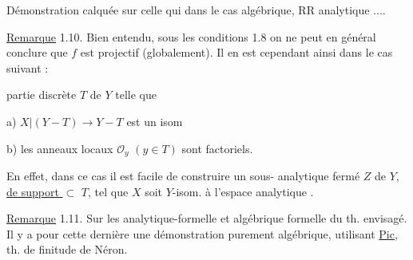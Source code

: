 Démonstration calquée sur celle qui  dans le cas algébrique,  RR analytique ....

\uline{Remarque} 1.10. Bien entendu, sous les conditions 1.8  on ne peut en général conclure que $f$ est projectif (globalement). Il en est cependant ainsi dans le cas suivant :

partie discrète $T$ de $Y$ telle que

a) $X|(Y-T)\longrightarrow Y-T$ est  un isom

b) les anneaux locaux $\mathcal O_y$ $(y\in T)$ sont factoriels.

En effet, dans ce cas il est facile de construire un sous- analytique fermé $Z$ de $Y$, \uline{de support $\subset$} $T$, tel que $X$ soit $Y$-isom. à l'espace analytique .

\uline{Remarque} 1.11. Sur les  analytique-formelle et algébrique formelle du th. envisagé. Il y a pour cette dernière une démonstration purement algébrique, utilisant \uline{Pic},  th. de finitude de Néron.

